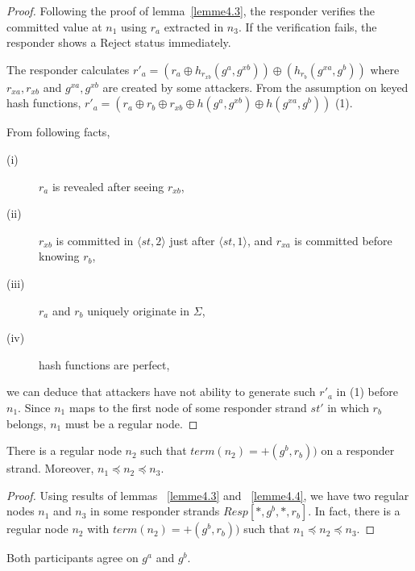 \begin{proof}
Following the proof of lemma~\ref{lemme4.3}, the responder verifies the committed value at $n_1$ using $r_a$ extracted in $n_3$. If the verification fails, the responder shows a Reject status immediately. 

The responder calculates $r'_{a} = (r_a \oplus h_{r_{xb}}(g^a,g^{xb})) \oplus (h_{r_b}(g^{xa},g^b))$ where $r_{xa},r_{xb}$ and $g^{xa},g^{xb}$ are created by some attackers. 
From the assumption on keyed hash functions, $r'_{a} = (r_a \oplus r_b \oplus r_{xb} \oplus h(g^a,g^{xb}) \oplus h(g^{xa},g^b))$ (1).

From following facts,
\begin{description} 
 \item [(i)] $r_a$ is revealed after seeing $r_{xb}$, 
 \item [(ii)] $r_{xb}$ is committed in $\langle st,2 \rangle$ just after $\langle st,1 \rangle$, and $r_{xa}$ is committed before knowing $r_b$, 
 \item[(iii)] $r_a$ and $r_b$ uniquely originate in $\Sigma$, 
 \item [(iv)] hash functions are perfect,
\end{description}
we can deduce that attackers have not ability to generate such $r'_{a}$ in (1) before $n_1$. 
Since $n_1$ maps to the first node of some responder strand $st'$ in which $r_b$ belongs, $n_1$ must be a regular node. 
\end{proof}

\begin{Lemma}\label{lemme4.5}
There is a regular node $n_2$ such that $term(n_2)= + (g^b,r_b))$ on a responder strand. Moreover, $n_1 \preceq n_2 \preceq n_3$.
\end{Lemma}

\begin{proof}
Using results of lemmas ~\ref{lemme4.3} and ~\ref{lemme4.4}, we have two regular nodes $n_1$ and $n_3$ in some responder strands $Resp[*,g^b,*,r_b]$. In fact, there is a regular node $n_2$ with $term(n_2)= + (g^b,r_b))$ such that $n_1 \preceq n_2 \preceq n_3$. 
\end{proof}

\begin{Lemma}\label{lemme4.6}
Both participants agree on $g^a$ and $g^b$. 
\end{Lemma}

